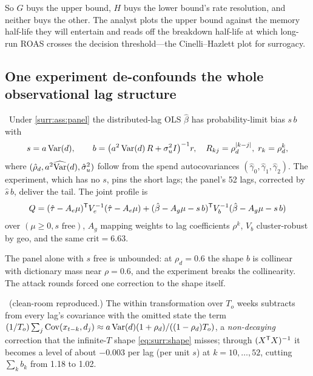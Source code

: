So $G$ buys the upper bound, $H$ buys the lower bound's rate resolution, and neither buys the other. The analyst plots the upper bound against the memory half-life they will entertain and reads off the breakdown half-life at which long-run ROAS crosses the decision threshold---the Cinelli--Hazlett plot for surrogacy.

\subsection{One experiment de-confounds the whole observational lag structure}

\begin{construction}
\label{surr:con:joint}
\tagEstablished\ Under \cref{surr:ass:panel} the distributed-lag OLS $\hat\beta$ has probability-limit bias $s\,b$ with
\begin{equation}
s = a\operatorname{Var}(d), \qquad b = \big(a^2\operatorname{Var}(d)\,R + \sigma_u^2 I\big)^{-1}r, \quad R_{kj} = \rho_d^{|k-j|},\; r_k = \rho_d^k,
\label{eq:surr:shape}
\end{equation}
where $(\hat\rho_d, a^2\widehat{\operatorname{Var}}(d), \hat\sigma_u^2)$ follow from the spend autocovariances $(\hat\gamma_0, \hat\gamma_1, \hat\gamma_2)$. The experiment, which has no $s$, pins the short lags; the panel's 52 lags, corrected by $\hat s\,b$, deliver the tail. The joint profile is
\begin{equation}
Q = (\hat\tau - A_e\mu)^{\mathsf{T}} V_e^{-1}(\hat\tau - A_e\mu) + (\hat\beta - A_g\mu - s\,b)^{\mathsf{T}} V_b^{-1}(\hat\beta - A_g\mu - s\,b)
\label{eq:surr:joint}
\end{equation}
over $(\mu \ge 0, s \text{ free})$, $A_g$ mapping weights to lag coefficients $\rho^k$, $V_b$ cluster-robust by geo, and the same $\mathrm{crit} = 6.63$.
\end{construction}

The panel alone with $s$ free is unbounded: at $\rho_d = 0.6$ the shape $b$ is collinear with dictionary mass near $\rho = 0.6$, and the experiment breaks the collinearity. The attack rounds forced one correction to the shape itself.

\begin{lemma}
\label{surr:lem:within}
\tagEstablished\ (clean-room reproduced.) The within transformation over $T_o$ weeks subtracts from every lag's covariance with the omitted state the term $(1/T_o)\sum_j\operatorname{Cov}(x_{t-k}, d_j) \approx a\operatorname{Var}(d)(1 + \rho_d)/((1 - \rho_d)T_o)$, a \emph{non-decaying} correction that the infinite-$T$ shape \cref{eq:surr:shape} misses; through $(X^{\mathsf{T}} X)^{-1}$ it becomes a level of about $-0.003$ per lag (per unit $s$) at $k = 10, \ldots, 52$, cutting $\sum_k b_k$ from 1.18 to 1.02.
\end{lemma}

